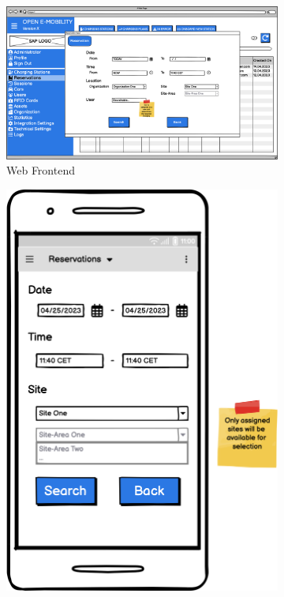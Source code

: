\begin{figure}
    \centering
     \begin{subfigure}[b]{0.6\textwidth}
         \centering
         \includegraphics[width=\textwidth]{resources/images/main/5_design/mockups/create_reservation/web/1_Reservation_Create.png}
         \caption{Web Frontend}
         \label{fig:web-create-reservation}
    \end{subfigure}
     \hfill
     \begin{subfigure}[b]{0.3\textwidth}
         \centering
         \includegraphics[width=\textwidth]{resources/images/main/5_design/mockups/create_reservation/mobile/2_Create_Reservation.png}

\end{subfigure}
\end{figure}
